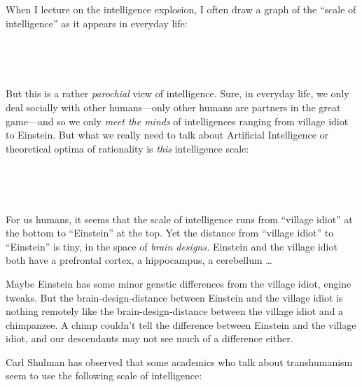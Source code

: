 \myendsectiontext


{
 When I lecture on the intelligence explosion, I often draw a graph
of the ``scale of intelligence'' as
it appears in everyday life:}

{
 ~}

{\centering
{}
 
\par}


\bigskip

{
 ~}

{
 But this is a rather \textit{parochial} view of intelligence.
Sure, in everyday life, we only deal socially with other humans---only
other humans are partners in the great game---and so we only
\textit{meet the minds} of intelligences ranging from village idiot to
Einstein. But what we really need to talk about Artificial Intelligence
or theoretical optima of rationality is \textit{this} intelligence
scale:}

{
 ~}

{\centering
{}
 
\par}


\bigskip

{
 ~}

{
 For us humans, it seems that the scale of intelligence runs from
``village idiot'' at the bottom to
``Einstein'' at the top. Yet the
distance from ``village idiot'' to
``Einstein'' is tiny, in the space
of \textit{brain designs.} Einstein and the village idiot both have a
prefrontal cortex, a hippocampus, a cerebellum \ldots}

{
 Maybe Einstein has some minor genetic differences from the village
idiot, engine tweaks. But the brain-design-distance between Einstein
and the village idiot is nothing remotely like the
brain-design-distance between the village idiot and a chimpanzee. A
chimp couldn't tell the difference between Einstein and
the village idiot, and our descendants may not see much of a difference
either.}

{
 Carl Shulman has observed that some academics who talk about
transhumanism seem to use the following scale of intelligence:}

{
 ~}

{\centering
{}
 
\par}



